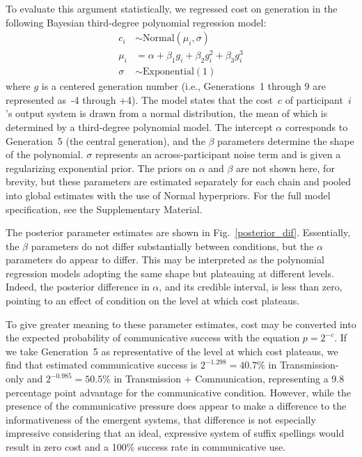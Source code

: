 \documentclass[doc,biblatex]{apa7}
\begin{document}
To evaluate this argument statistically, we regressed cost on generation in the following Bayesian third-degree polynomial regression model:
	\begin{align*}
	   c_i & \sim \mathrm{Normal}(\mu_i, \sigma) \\
	 \mu_i & =    \alpha + \beta_1 g_i + \beta_2 g_i^2 + \beta_3 g_i^3 \\
	\sigma & \sim \mathrm{Exponential}(1)
	\end{align*}
where $g$ is a centered generation number (i.e., Generations~1 through 9 are represented as~-4 through +4). The model states that the cost~$c$ of participant~$i$'s output system is drawn from a normal distribution, the mean of which is determined by a third-degree polynomial model. The intercept $\alpha$ corresponds to Generation~5 (the central generation), and the $\beta$ parameters determine the shape of the polynomial. $\sigma$ represents an across-participant noise term and is given a regularizing exponential prior. The priors on $\alpha$ and $\beta$ are not shown here, for brevity, but these parameters are estimated separately for each chain and pooled into global estimates with the use of Normal hyperpriors. For the full model specification, see the Supplementary Material.

The posterior parameter estimates are shown in Fig.~\ref{posterior_dif}. Essentially, the $\beta$ parameters do not differ substantially between conditions, but the $\alpha$ parameters do appear to differ. This may be interpreted as the polynomial regression models adopting the same shape but plateauing at different levels. Indeed, the posterior difference in $\alpha$, and its credible interval, is less than zero, pointing to an effect of condition on the level at which cost plateaus.

To give greater meaning to these parameter estimates, cost may be converted into the expected probability of communicative success with the equation $p=2^{-c}$. If we take Generation~5 as representative of the level at which cost plateaus, we find that estimated communicative success is $2^{-1.298} = 40.7$\% in Transmission-only and $2^{-0.985} = 50.5$\% in Transmission + Communication, representing a 9.8 percentage point advantage for the communicative condition. However, while the presence of the communicative pressure does appear to make a difference to the informativeness of the emergent systems, that difference is not especially impressive considering that an ideal, expressive system of suffix spellings would result in zero cost and a 100\% success rate in communicative use.
\end{document}
